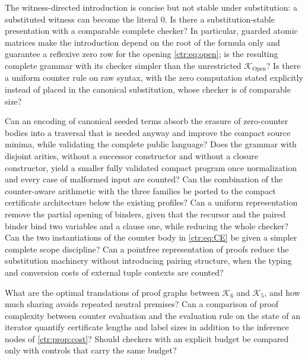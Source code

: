 \begin{question}
The witness-directed introduction is concise but not stable under substitution: a
substituted witness can become the literal $0$. Is there a substitution-stable presentation
with a comparable complete checker? In particular, guarded atomic matrices make the
introduction depend on the root of the formula only and guarantee a reflexive zero row for
the opening \eqref{ctr:eq:open}; is the resulting complete grammar with its checker simpler
than the unrestricted $\mathcal K_{\mathrm{Open}}$? Is there a uniform counter rule on raw
syntax, with the zero computation stated explicitly instead of placed in the canonical
substitution, whose checker is of comparable size?
\end{question}

\begin{question}
Can an encoding of canonical seeded terms absorb the erasure of zero-counter bodies into a
traversal that is needed anyway and improve the compact source minima, while validating the
complete public language? Does the grammar with disjoint arities, without a successor
constructor and without a closure constructor, yield a smaller fully validated compact
program once normalization and every case of malformed input are counted? Can the
combination of the counter-aware arithmetic with the three families be ported to the compact
certificate architecture below the existing profiles? Can a uniform representation remove
the partial opening of binders, given that the recursor and the paired binder bind two
variables and a clause one, while reducing the whole checker? Can the two instantiations of
the counter body in \eqref{ctr:eq:CE} be given a simpler complete scope discipline? Can a
pointfree representation of proofs reduce the substitution machinery without introducing
pairing structure, when the typing and conversion costs of external tuple contexts are
counted?
\end{question}

\begin{question}
What are the optimal translations of proof graphs between $\mathcal K_6$ and
$\mathcal K_5$, and how much sharing avoids repeated neutral premises? Can a comparison of
proof complexity between counter evaluation and the evaluation rule on the state of an
iterator quantify certificate lengths and label sizes in addition to the inference nodes of
\cref{ctr:prop:cost}? Should checkers with an explicit budget be compared only with
controls that carry the same budget?
\end{question}

